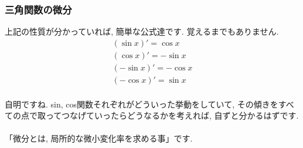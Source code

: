 \documentclass[11pt,a4paper]{jsarticle}
\begin{document}
\subsubsection{三角関数の微分}
上記の性質が分かっていれば, 簡単な公式達です. 覚えるまでもありません.
\begin{eqnarray}
(\sin x)' = \cos x \\
(\cos x)' = -\sin x \\
(-\sin x)' = -\cos x \\
(-\cos x)' = \sin x
\end{eqnarray}
\\
自明ですね. sin, cos関数それぞれがどういった挙動をしていて, その傾きをすべての点で取ってつなげていったらどうなるかを考えれば, 自ずと分かるはずです.\\
\\
「微分とは, 局所的な微小変化率を求める事」です.\\
\end{document}
